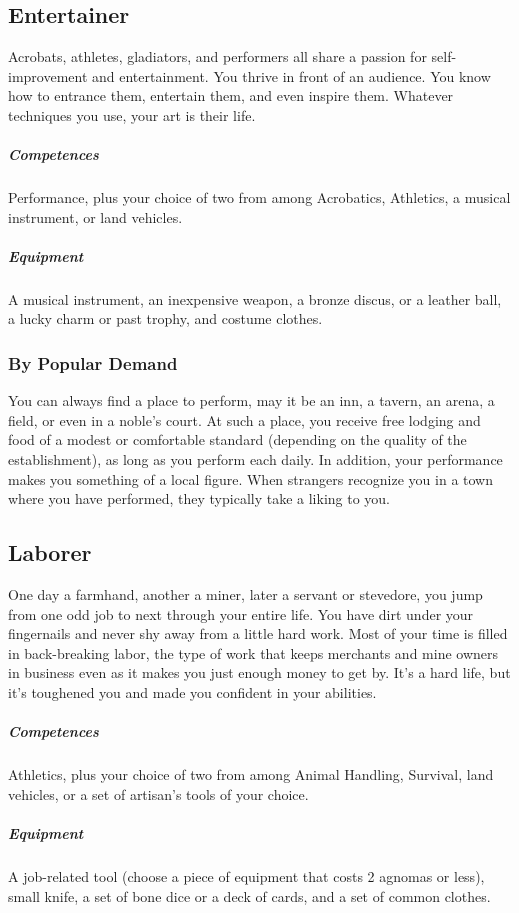 \subsection*{Entertainer} \label{ssec::entertainer}
    Acrobats, athletes, gladiators, and performers all share a passion for self-improvement and entertainment. %
    You thrive in front of an audience.
    You know how to entrance them, entertain them, and even inspire them.
    Whatever techniques you use, your art is their life.
    \subparagraph{Competences} Performance, plus your choice of two from among Acrobatics, Athletics, a musical instrument, or land vehicles.
    \subparagraph{Equipment} A musical instrument, an inexpensive weapon, a bronze discus, or a leather ball, a lucky charm or past trophy, and costume clothes.
    \subsubsection{By Popular Demand}
        You can always find a place to perform, may it be an inn, a tavern, an arena, a field, or even in a noble's court.
        At such a place, you receive free lodging and food of a modest or comfortable standard (depending on the quality of the establishment), as long as you perform each daily.
        In addition, your performance makes you something of a local figure.
        When strangers recognize you in a town where you have performed, they typically take a liking to you.

\subsection*{Laborer} \label{ssec::laborer}
    One day a farmhand, another a miner, later a servant or stevedore, you jump from one odd job to next through your entire life.
    You have dirt under your fingernails and never shy away from a little hard work.
    Most of your time is filled in back-breaking labor, the type of work that keeps merchants and mine owners in business even as it makes you just enough money to get by.
    It’s a hard life, but it’s toughened you and made you confident in your abilities.
    \subparagraph{Competences} Athletics, plus your choice of two from among Animal Handling, Survival, land vehicles, or a set of artisan's tools of your choice.
    \subparagraph{Equipment} A job-related tool (choose a piece of equipment that costs 2 agnomas or less), small knife, a set of bone dice or a deck of cards, and a set of common clothes.
